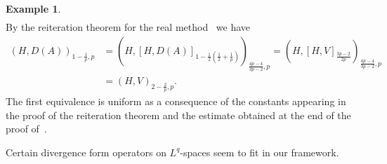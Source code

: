 \documentclass[reqno,a4paper,final]{amsart}
\numberwithin{equation}{section}
\theoremstyle{definition}
\newtheorem{example}[lemma]{Example}
\begin{document}
\begin{example}
\begin{align*}
		\end{align*}
		By the reiteration theorem for the real method~\cite[1.10.3, Theorem~2]{Tri78} we have
		\begin{align*}
			(H,D(A))_{1-\frac{1}{p},p} & = (H,[H,D(A)]_{1-\frac{1}{2}(\frac{1}{2} + \frac{1}{p})})_{\frac{4p-4}{3p-2},p} = (H,[H,V]_{\frac{3p-2}{2p}})_{\frac{4p-4}{3p-2},p} \\
			& = (H, V)_{2-\frac{2}{p},p}.
		\end{align*}
		The first equivalence is uniform as a consequence of the constants appearing in the proof of the reiteration theorem and the estimate obtained at the end of the proof of~\cite[1.10.3, Theorem~1]{Tri78}.
	 \end{example}
	 
	 Certain divergence form operators on $L^q$-spaces seem to fit in our framework.
	 
\end{document}
